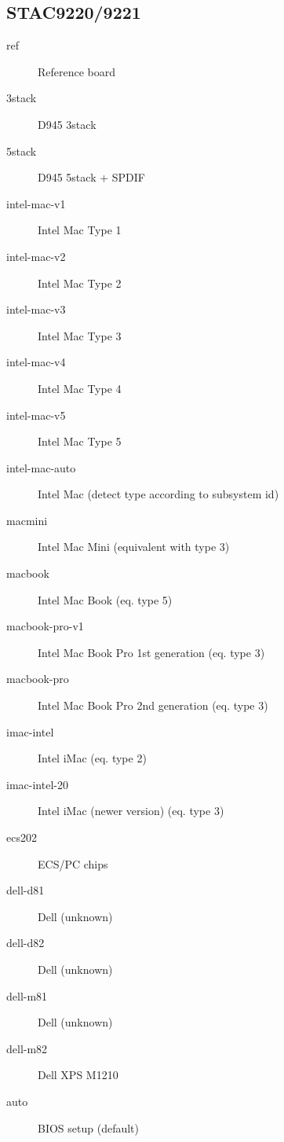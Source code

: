 \documentclass[a4paper,8pt,english]{sphinxmanual}
\begin{document}
\subsection{STAC9220/9221}
\label{sound/hd-audio/models:stac9220-9221}\begin{description}
\item[{ref}] \leavevmode
Reference board

\item[{3stack}] \leavevmode
D945 3stack

\item[{5stack}] \leavevmode
D945 5stack + SPDIF

\item[{intel-mac-v1}] \leavevmode
Intel Mac Type 1

\item[{intel-mac-v2}] \leavevmode
Intel Mac Type 2

\item[{intel-mac-v3}] \leavevmode
Intel Mac Type 3

\item[{intel-mac-v4}] \leavevmode
Intel Mac Type 4

\item[{intel-mac-v5}] \leavevmode
Intel Mac Type 5

\item[{intel-mac-auto}] \leavevmode
Intel Mac (detect type according to subsystem id)

\item[{macmini}] \leavevmode
Intel Mac Mini (equivalent with type 3)

\item[{macbook}] \leavevmode
Intel Mac Book (eq. type 5)

\item[{macbook-pro-v1}] \leavevmode
Intel Mac Book Pro 1st generation (eq. type 3)

\item[{macbook-pro}] \leavevmode
Intel Mac Book Pro 2nd generation (eq. type 3)

\item[{imac-intel}] \leavevmode
Intel iMac (eq. type 2)

\item[{imac-intel-20}] \leavevmode
Intel iMac (newer version) (eq. type 3)

\item[{ecs202}] \leavevmode
ECS/PC chips

\item[{dell-d81}] \leavevmode
Dell (unknown)

\item[{dell-d82}] \leavevmode
Dell (unknown)

\item[{dell-m81}] \leavevmode
Dell (unknown)

\item[{dell-m82}] \leavevmode
Dell XPS M1210

\item[{auto}] \leavevmode
BIOS setup (default)

\end{description}
\end{document}
